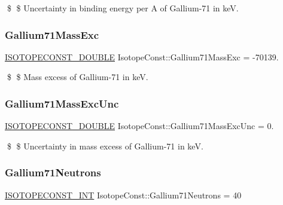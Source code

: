 \$ \$ Uncertainty in binding energy per A of Gallium-\/71 in keV. \mbox{\label{group___isotope_const-_gallium-_ga71_gacc29748b0d7c416b796039ae24387ce1}} 
\subsubsection{\texorpdfstring{Gallium71\+Mass\+Exc}{Gallium71MassExc}}
{\footnotesize\ttfamily \mbox{\hyperlink{group___isotope_const-_macros_ga8f45a7272ce02c0b4c65c44636ed719a}{I\+S\+O\+T\+O\+P\+E\+C\+O\+N\+S\+T\+\_\+\+D\+O\+U\+B\+LE}} Isotope\+Const\+::\+Gallium71\+Mass\+Exc = -\/70139.}

\$ \$ Mass excess of Gallium-\/71 in keV. \mbox{\label{group___isotope_const-_gallium-_ga71_ga32d02734ba7a8cd0adb1cfd2eb44fdb1}} 
\subsubsection{\texorpdfstring{Gallium71\+Mass\+Exc\+Unc}{Gallium71MassExcUnc}}
{\footnotesize\ttfamily \mbox{\hyperlink{group___isotope_const-_macros_ga8f45a7272ce02c0b4c65c44636ed719a}{I\+S\+O\+T\+O\+P\+E\+C\+O\+N\+S\+T\+\_\+\+D\+O\+U\+B\+LE}} Isotope\+Const\+::\+Gallium71\+Mass\+Exc\+Unc = 0.}

\$ \$ Uncertainty in mass excess of Gallium-\/71 in keV. \mbox{\label{group___isotope_const-_gallium-_ga71_gaba0b55abe4e7374c94a1fb2a2f469cd0}} 
\subsubsection{\texorpdfstring{Gallium71\+Neutrons}{Gallium71Neutrons}}
{\footnotesize\ttfamily \mbox{\hyperlink{group___isotope_const-_macros_ga5f18360b3e99483a35c32d789e62621c}{I\+S\+O\+T\+O\+P\+E\+C\+O\+N\+S\+T\+\_\+\+I\+NT}} Isotope\+Const\+::\+Gallium71\+Neutrons = 40}

